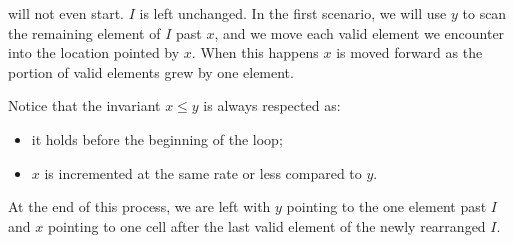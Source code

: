 will not even start. $I$ is left unchanged.
In the first scenario, we will use $y$ to scan the remaining element of $I$ past $x$, and we move each valid element we encounter 
into the location pointed by $x$. When this happens $x$ is moved forward as the portion of valid elements grew by one element. 

Notice that the invariant $x \leq y$ is always respected as:
\begin{itemize}
	\item it holds before the beginning of the loop;
	\item $x$ is incremented at the same rate or less compared to $y$.
\end{itemize}

At the end of this process, we are left with $y$ pointing to the one element past $I$ and $x$ pointing to one cell after the last valid element of the newly rearranged $I$.